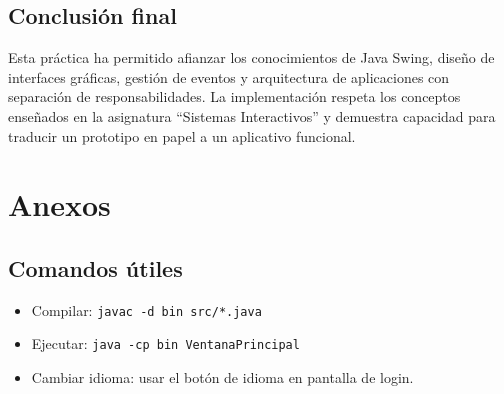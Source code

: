 \documentclass[12pt,a4paper]{report}
\begin{document}
\section{Conclusión final}
Esta práctica ha permitido afianzar los conocimientos de Java Swing, diseño de interfaces gráficas, gestión de eventos y arquitectura de aplicaciones con separación de responsabilidades. La implementación respeta los conceptos enseñados en la asignatura ``Sistemas Interactivos'' y demuestra capacidad para traducir un prototipo en papel a un aplicativo funcional.

\appendix
\chapter{Anexos}
\section{Comandos útiles}
\begin{itemize}
    \item Compilar: \texttt{javac -d bin src/*.java}
    \item Ejecutar: \texttt{java -cp bin VentanaPrincipal}
    \item Cambiar idioma: usar el botón de idioma en pantalla de login.
\end{itemize}
\end{document}
